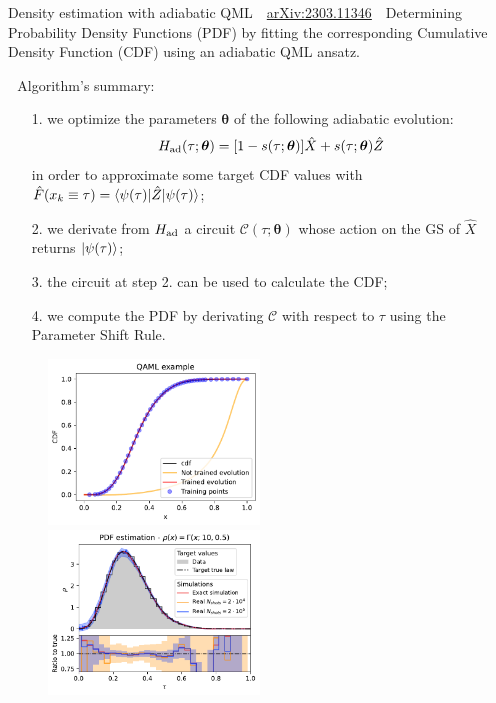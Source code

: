 \documentclass[8pt, xcolor={svgnames}]{beamer}
\begin{document}
\begin{frame}{Density estimation with adiabatic QML  \hfill \faBook\,\, \href{https://arxiv.org/abs/2303.11346}{arXiv:2303.11346}}
\small
\faCrosshairs\,\, Determining Probability Density Functions (PDF) by fitting the 
corresponding Cumulative Density Function (CDF) using an adiabatic QML ansatz.

\faFlash\,\, Algorithm's summary:
\begin{itemize}[noitemsep]
\item[1.] we optimize the parameters $\bm{\theta}$ of the following adiabatic evolution:
\begin{equation} 
H_{\rm ad}(\tau; \bm{\theta}) = [1-s(\tau; \bm{\theta})] \hat{X} + s(\tau; \bm{\theta})\hat{Z}
\end{equation}
in order to approximate some target CDF values with $\hat{F}(x_k \equiv \tau) = \braket{\psi(\tau)|\hat{Z}|\psi(\tau)}$;
\item[2.] we derivate from $H_{\rm ad}$ a circuit $\mathcal{C}(\tau; \bm{\theta})$ whose action 
on the GS of $\hat{X}$ returns $\ket{\psi(\tau)}$;
\item[3.] the circuit at step 2. can be used to calculate the CDF;
\item[4.] we compute the PDF by derivating $\mathcal{C}$ with respect to $\tau$ 
using the Parameter Shift Rule.
\end{itemize}
\begin{figure}  
    \includegraphics[width=0.5\textwidth]{figures/evolution.pdf}%
    \includegraphics[width=0.5\textwidth]{figures/PDF.pdf}
\end{figure}


\end{frame}
\end{document}

